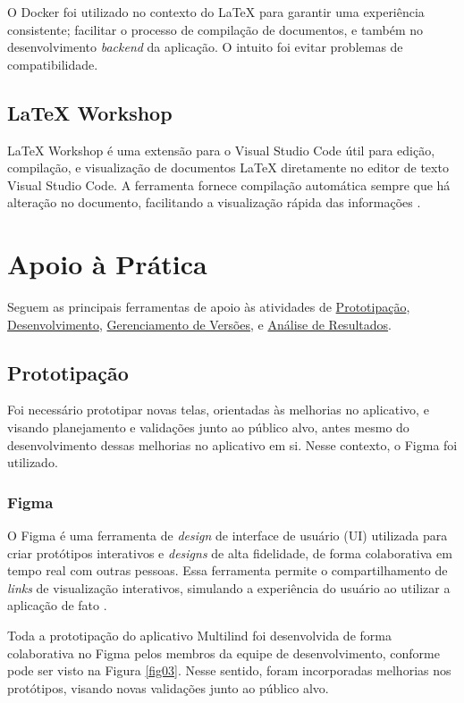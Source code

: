 O Docker foi utilizado no contexto do LaTeX para garantir uma experiência consistente; facilitar o 
processo de compilação de documentos, e também no desenvolvimento \textit{backend} da aplicação. O intuito foi evitar problemas 
de compatibilidade.

\subsection{LaTeX Workshop}
\label{sec:LaTeX Workshop}
LaTeX Workshop é uma extensão para o Visual Studio Code útil para edição, compilação, e visualização de 
documentos LaTeX diretamente no editor de texto Visual Studio Code. A ferramenta fornece compilação 
automática sempre que há alteração no documento, facilitando a visualização rápida das informações \cite{latexworkshop}.

\section{Apoio à Prática}
\label{sec:Apoio à Prática}
Seguem as principais ferramentas de apoio às atividades de \hyperref[sec:Prototipacao]{Prototipação}, \hyperref[sec:Desenvolvimento]{Desenvolvimento}, 
\hyperref[sec:Gerenciamento de Versoes]{Gerenciamento de Versões}, e \hyperref[sec:Análise de Resultados]{Análise de Resultados}.

\subsection{Prototipação}
\label{sec:Prototipacao}
Foi necessário prototipar novas telas, orientadas às melhorias no aplicativo, e visando planejamento e validações 
junto ao público alvo, antes mesmo do desenvolvimento dessas melhorias no aplicativo em si. Nesse contexto, o Figma 
foi utilizado.

\subsubsection{Figma}
\label{sec:Figma}
O Figma é uma ferramenta de \textit{design} de interface de usuário (UI) utilizada para criar protótipos interativos e \textit{designs} de alta fidelidade, de forma  
colaborativa em tempo real com outras pessoas. Essa ferramenta permite o compartilhamento de \textit{links} de visualização interativos, simulando a experiência 
do usuário ao utilizar a aplicação de fato \cite{figma}.

Toda a prototipação do aplicativo Multilind foi desenvolvida de forma colaborativa no Figma pelos membros da equipe de desenvolvimento, conforme pode ser visto 
na Figura \ref{fig03}. Nesse sentido, foram incorporadas melhorias nos protótipos, visando novas validações junto ao público alvo.  

